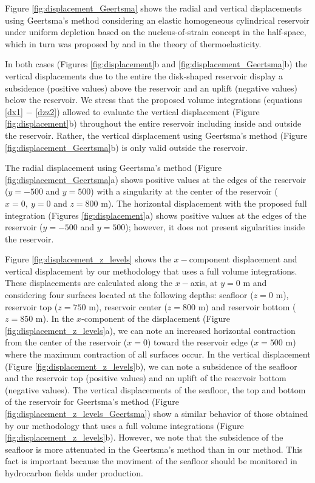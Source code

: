 \documentclass[journal abbreviation, manuscript]{copernicus}
\begin{document}
Figure \ref{fig:displacement_Geertsma} shows the radial and vertical displacements using Geertsma’s method \citep{Geertsma73}  considering an elastic homogeneous cylindrical reservoir under uniform depletion based on the nucleus-of-strain concept in the half-space, which in turn was proposed by \cite{Mindlin&Cheng50} and \cite{Sen51} in the theory of thermoelasticity.

In both cases (Figures \ref{fig:displacement}b and \ref{fig:displacement_Geertsma}b) the vertical displacements due to the entire the disk-shaped reservoir display a subsidence (positive values) above the reservoir and an uplift (negative values) below the reservoir.
We stress that the proposed volume integrations  (equations \ref{dx1} $-$ \ref{dzz2})  allowed  to evaluate the  vertical displacement (Figure \ref{fig:displacement}b) throughout  the entire reservoir including inside and outside the reservoir.
Rather, the  vertical displacement using Geertsma’s method 
(Figure \ref{fig:displacement_Geertsma}b) is only valid outside the reservoir. 

The radial displacement using Geertsma’s method 
(Figure \ref{fig:displacement_Geertsma}a) shows positive values at the edges of the reservoir ($y= -500$ and $y = 500$) with a singularity at the center of the reservoir 
($x= 0, \: y = 0$ and $z = 800$ m). 
The horizontal displacement with the proposed full integration 
(Figures \ref{fig:displacement}a) shows positive values at the edges of the reservoir ($y= -500$ and $y = 500$); however, it does not present sigularities inside the reservoir.
 
Figure \ref{fig:displacement_z_levels} shows the $x-$component displacement and vertical displacement by our methodology that uses a full volume integrations.
These displacements are calculated along the $x-$axis, at $y = 0$ m and considering four surfaces located at the following depths:  seafloor ($z = 0$ m), reservoir top ($z = 750$ m), reservoir center ($z = 800$ m) and reservoir bottom ($z = 850$ m).
In the $x$-component of the displacement (Figure \ref{fig:displacement_z_levels}a), we can note an increased horizontal contraction from the center of the reservoir ($x = 0$) toward the reservoir edge ($x= 500$ m) where the maximum contraction of all surfaces occur.
In the vertical displacement (Figure \ref{fig:displacement_z_levels}b), we can note a subsidence of the seafloor and the reservoir top (positive values) and an uplift of the reservoir bottom (negative values).
The vertical displacements of the seafloor, the top and bottom of the reservoir for Geertsma’s method (Figure \ref{fig:displacement_z_levels_Geertsma}) show a similar behavior of those obtained by our methodology that uses a full volume integrations (Figure \ref{fig:displacement_z_levels}b). 
However, we note that the subsidence of the seafloor is more attenuated in the Geertsma’s method than in our method.
This fact is important because the moviment of the seafloor should be monitored in hydrocarbon fields under production.
\end{document}
